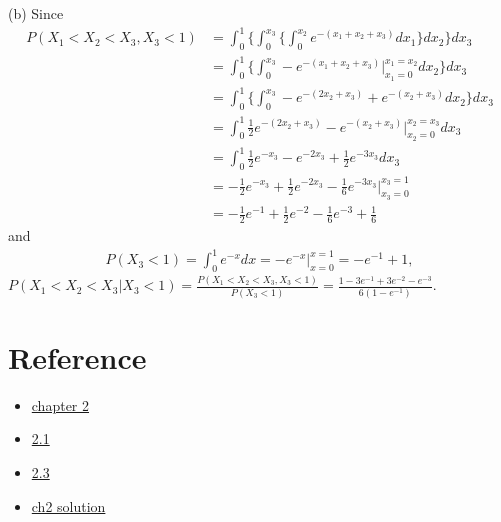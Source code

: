 \begin{solve}
    \par
    (b) Since
    \begin{align*}
        P(X_1<X_2<X_3,X_3<1)&=\int_{0}^{1}\{\int_{0}^{x_3}\{\int_{0}^{x_2}e^{-(x_1+x_2+x_3)} dx_1\}dx_2\}dx_3\\
                            &=\int_{0}^{1}\{\int_{0}^{x_3}-e^{-(x_1+x_2+x_3)}|_{x_1=0}^{x_1=x_2}dx_2\}dx_3\\
                            &=\int_{0}^{1}\{\int_{0}^{x_3}-e^{-(2x_2+x_3)}+e^{-(x_2+x_3)}dx_2\}dx_3\\
                            &= \int_{0}^{1} \frac{1}{2}e^{-(2x_2+x_3)}-e^{-(x_2+x_3)}|_{x_2=0}^{x_2=x_3}dx_3\\
                            &= \int_{0}^{1} \frac{1}{2} e^{-x_3} -e^{-2x_3}+\frac{1}{2}e^{-3x_3}dx_3\\
                            &= -\frac{1}{2}e^{-x_3}+\frac{1}{2}e^{-2x_3}-\frac{1}{6}e^{-3x_3}|_{x_3=0}^{x_3=1}\\
                            &= -\frac{1}{2}e^{-1} + \frac{1}{2}e^{-2}-\frac{1}{6}e^{-3}+\frac{1}{6}
    \end{align*}
    and 
    \begin{align*}
        P(X_3<1) = \int_{0}^{1} e^{-x} dx = -e^{-x}|_{x=0}^{x=1}=-e^{-1}+1,
    \end{align*}
    $P(X_1<X_2<X_3|X_3<1)=\frac{P(X_1<X_2<X_3,X_3<1)}{P(X_3<1)}=\frac{1-3e^{-1}+3e^{-2}-e^{-3}}{6(1-e^{-1})}$.
\end{solve}



\section{Reference}
\begin{itemize}
    \item \href{https://ccrgpages.rit.edu/~whelan/courses/2013_3fa_STAT_405/notes02.pdf}{chapter 2}
    \item \href{https://faculty.etsu.edu/gardnerr/4047/notes-Hogg-McKean-Craig/Hogg-McKean-Craig-2-1.pdf}{2.1}
    \item \href{https://faculty.etsu.edu/gardnerr/4047/notes-Hogg-McKean-Craig/Hogg-McKean-Craig-2-3.pdf}{2.3}
    \item \href{https://tomoki-okuno.com/files/math/Ch2_sol.pdf}{ch2 solution}
\end{itemize}